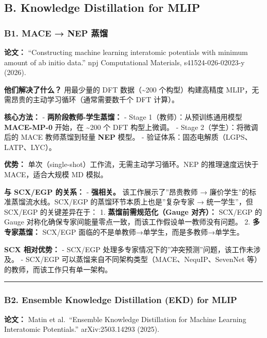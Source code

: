 \documentclass[
  12pt,
]{ctexart}
\begin{document}
\subsection{B. Knowledge Distillation for
MLIP}\label{b.-knowledge-distillation-for-mlip}

\subsubsection{B1. MACE → NEP 蒸馏}\label{b1.-mace-nep-ux84b8ux998f}

\textbf{论文：} ``Constructing machine learning interatomic potentials
with minimum amount of ab initio data.'' npj Computational Materials,
s41524-026-02023-y (2026).

\textbf{他们解决了什么？} 用最少量的 DFT 数据（\textasciitilde200
个构型）构建高精度 MLIP，无需昂贵的主动学习循环（通常需要数千个 DFT
计算）。

\textbf{核心方法：} - \textbf{两阶段教师-学生蒸馏：} - Stage
1（教师）：从预训练通用模型 \textbf{MACE-MP-0} 开始，在
\textasciitilde200 个 DFT 构型上微调。 - Stage 2（学生）：将微调后的
MACE 教师蒸馏到轻量 \textbf{NEP} 模型。 -
验证体系：固态电解质（LGPS、LATP、LYC）。

\textbf{优势：} 单次（single-shot）工作流，无需主动学习循环。NEP
的推理速度远快于 MACE，适合大规模 MD 模拟。

\textbf{与 SCX/EGP 的关系：} - \textbf{强相关。} 该工作展示了''昂贵教师
→ 廉价学生''的标准蒸馏流水线。SCX/EGP 的蒸馏环节本质上也是''复杂专家 →
统一学生''，但 SCX/EGP 的关键差异在于： 1. \textbf{蒸馏前需规范化（Gauge
对齐）：} SCX/EGP 的 Gauge
对称化确保专家间能量零点一致，而该工作假设单一教师没有问题。 2.
\textbf{多专家蒸馏：} SCX/EGP
面临的不是单教师→单学生，而是多教师→单学生。

\textbf{SCX 相对优势：} - SCX/EGP
处理多专家情况下的''冲突预测''问题，该工作未涉及。 - SCX/EGP
可以蒸馏来自不同架构类型（MACE、NequIP、SevenNet
等）的教师，而该工作只有单一架构。

\begin{center}\rule{0.5\linewidth}{0.5pt}\end{center}

\subsubsection{B2. Ensemble Knowledge Distillation (EKD) for
MLIP}\label{b2.-ensemble-knowledge-distillation-ekd-for-mlip}

\textbf{论文：} Matin et al.~``Ensemble Knowledge Distillation for
Machine Learning Interatomic Potentials.'' arXiv:2503.14293 (2025).
\end{document}
